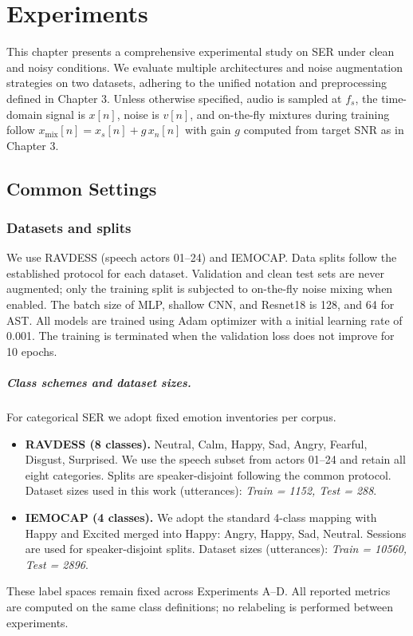 
\chapter{Experiments}

This chapter presents a comprehensive experimental study on SER under clean and noisy conditions. We evaluate multiple architectures and noise augmentation strategies on two datasets, adhering to the unified notation and preprocessing defined in Chapter 3. Unless otherwise specified, audio is sampled at \(f_s\), the time-domain signal is \(x[n]\), noise is \(v[n]\), and on-the-fly mixtures during training follow
\(x_{\mathrm{mix}}[n] = x_s[n] + g\, x_n[n]\) with gain \(g\) computed from target SNR as in Chapter 3.

\section{Common Settings}

\subsection{Datasets and splits}
We use RAVDESS (speech actors 01–24) and IEMOCAP. Data splits follow the established protocol for each dataset. Validation and clean test sets are never augmented; only the training split is subjected to on-the-fly noise mixing when enabled. The batch size of MLP, shallow CNN, and Resnet18 is 128, and 64 for AST. All models are trained using Adam \cite{Kingma2014Adam} optimizer with a initial learning rate of 0.001. The training is terminated when the validation loss does not improve for 10 epochs.

\paragraph{Class schemes and dataset sizes.}
For categorical SER we adopt fixed emotion inventories per corpus.
\begin{itemize}
  \item \textbf{RAVDESS (8 classes).} Neutral, Calm, Happy, Sad, Angry, Fearful, Disgust, Surprised. We use the speech subset from actors 01–24 and retain all eight categories. Splits are speaker-disjoint following the common protocol. Dataset sizes used in this work (utterances): \textit{Train = 1152,  Test = 288}.
  \item \textbf{IEMOCAP (4 classes).} We adopt the standard 4-class mapping with Happy and Excited merged into Happy: Angry, Happy, Sad, Neutral. Sessions are used for speaker-disjoint splits. Dataset sizes (utterances): \textit{Train = 10560, Test = 2896}.
\end{itemize}
These label spaces remain fixed across Experiments A–D. All reported metrics are computed on the same class definitions; no relabeling is performed between experiments.

